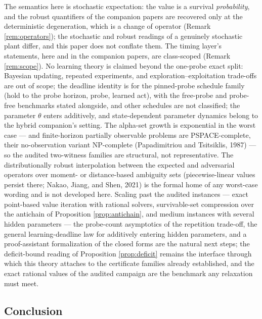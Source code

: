 \documentclass[10pt,twocolumn]{article}
\theoremstyle{plain}
\theoremstyle{definition}
\theoremstyle{remark}
\begin{document}
The semantics here is stochastic expectation: the value is a survival
\emph{probability}, and the robust quantifiers of the companion papers
are recovered only at the deterministic degeneration, which is a change
of operator (Remark \ref{rem:operators}); the stochastic and robust
readings of a genuinely stochastic plant differ, and this paper does not
conflate them. The timing layer's statements, here and in the companion
papers, are class-scoped (Remark \ref{rem:scope}). No learning theory is
claimed beyond the one-probe exact split: Bayesian updating, repeated
experiments, and exploration--exploitation trade-offs are out of scope;
the deadline identity is for the pinned-probe schedule family (hold to
the probe horizon, probe, learned act), with the free-probe and
probe-free benchmarks stated alongside, and other schedules are not
classified; the parameter
\(\theta\) enters additively, and state-dependent parameter dynamics
belong to the hybrid companion's setting. The alpha-set growth is
exponential in the worst case --- and finite-horizon partially
observable problems are PSPACE-complete, their no-observation variant
NP-complete (Papadimitriou and Tsitsiklis, 1987) --- so the audited
two-witness families are structural, not representative. The
distributionally robust interpolation between the expected and
adversarial operators over moment- or distance-based ambiguity sets
(piecewise-linear values persist there; Nakao, Jiang, and Shen, 2021) is
the formal home of any worst-case wording and is not developed here.
Scaling past the audited instances --- exact point-based value iteration
with rational solvers, survivable-set compression over the antichain of
Proposition \ref{prop:antichain}, and medium instances with several
hidden parameters --- the probe-count asymptotics of the repetition
trade-off, the general learning-deadline law for additively entering
hidden parameters, and a proof-assistant formalization of the closed
forms are the natural next steps; the deficit-bound reading of
Proposition \ref{prop:deficit} remains the interface through which this
theory attaches to the certificate families already established, and the
exact rational values of the audited campaign are the benchmark any
relaxation must meet.

\subsection{Conclusion}\label{conclusion}
\end{document}
